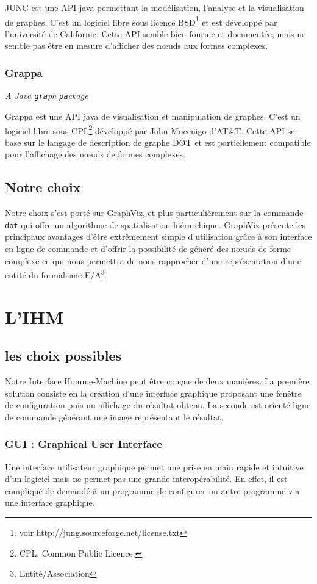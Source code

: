 				JUNG est une API java permettant la modélisation, l'analyse et la visualisation de graphes. C'est un logiciel libre sous licence BSD\footnote{voir http://jung.sourceforge.net/license.txt} et est développé par l'université de Californie. Cette API semble bien fournie et documentée, mais ne semble pas être en mesure d'afficher des nœuds aux formes complexes. 
		\subsubsection{Grappa} \textit{A Java \texttt{gra}ph \texttt{pa}ckage}
		
			Grappa est une API java de visualisation et manipulation de graphes. C'est un logiciel libre sous CPL\footnote{CPL, Common Public Licence.} développé par John Mocenigo d'AT\&T. Cette API se base sur le langage de description de graphe DOT et est partiellement compatible pour l'affichage des nœuds de formes complexes.
		
				
  \subsection{Notre choix}
		Notre choix s'est porté sur GraphViz, et plus particulièrement sur la commande \texttt{dot} qui offre un algorithme de spatialisation hiérarchique. GraphViz présente les principaux avantages d'être extrêmement simple d'utilisation grâce à son interface en ligne de commande et d'offrir la possibilité de généré des nœuds de forme complexe ce qui nous permettra de nous rapprocher d'une représentation d'une entité du formalisme E/A\footnote{Entité/Association}.

\section{L'IHM}	
	\subsection{les choix possibles}
	\label{ihm_choix_possibles}
		Notre Interface Homme-Machine peut être conçue de deux manières. La première solution consiste en la création d'une interface graphique proposant une fenêtre de configuration puis un affichage du résultat obtenu. La seconde est orienté ligne de commande générant une image représentant le résultat. 	
	
		\subsubsection{GUI : \og Graphical User Interface \fg{}}
			Une interface utilisateur graphique permet une prise en main rapide et intuitive d'un logiciel mais ne permet pas une grande interopérabilité. En effet, il est compliqué de demandé à un programme de configurer un autre programme via une interface graphique.
			
